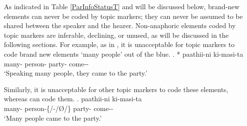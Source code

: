 As indicated in Table \ref{ParInfoStatusT} and will be discussed below,
brand-new elements can never be coded by topic markers;
they can never be assumed to be shared between the speaker and the hearer.
Non-anaphoric elements coded by topic markers are
inferable, declining, or unused,
as will be discussed in the following sections.
For example,
as in \Next,
it is unacceptable for topic markers to code brand new elements  `many people' out of the blue.
%
\exg.
 *  paathii-ni ki-masi-ta \\
  many- person- party- come-- \\
  `Speaking many people, they came to the party.'
    \hfill{\cite[~45]{kuno73}}

Similarly, it is unacceptable for other topic markers to code these elements, whereas  can code them.
%
\exg.
   paathii-ni ki-masi-ta \\
 many- person-{\{/-/{\O}/\}} party- come-- \\
 `Many people came to the party.'



